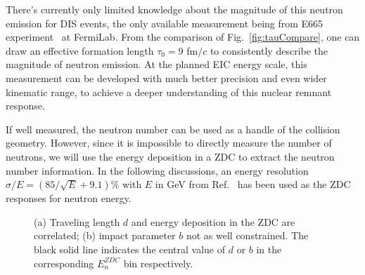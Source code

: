 There's currently only limited knowledge about the magnitude of this neutron emission
for DIS events, the only available measurement being
from E665 experiment~\cite{Adams:1995nu} at FermiLab. From the comparison of
Fig.~\ref{fig:tauCompare}, one can draw an effective formation length $\tau_{0}=9$ fm$/c$
to consistently describe the magnitude of neutron emission. At the planned EIC
energy scale, this measurement can be developed with much better precision and
even wider kinematic range, to achieve a deeper understanding of this
nuclear remnant response.


If well measured, the neutron number can be used as a handle of the collision
geometry. However, since it is impossible to directly measure the number of
neutrons, we will use the energy deposition in a ZDC to extract the neutron
number information. In the following discussions, an energy resolution $\sigma/E
= (85/\sqrt{E} + 9.1)\%$ with $E$ in GeV from Ref.~\cite{Adler:2000bd} has been used as the ZDC
responses for neutron energy. 

\begin{figure}[hbt!]
\begin{center} 
\quad
{}
\caption[Geometric quantity correlation with neutron energy deposit]
{(a) Traveling length $d$ and energy deposition in the ZDC are correlated; (b) impact parameter $b$ not as well constrained. The black solid line indicates the central value of $d$ or $b$ in the corresponding $E_{n}^{ZDC}$ bin respectively. } \label{fig:geoCorrelation}
\end{center} 
\end{figure}



